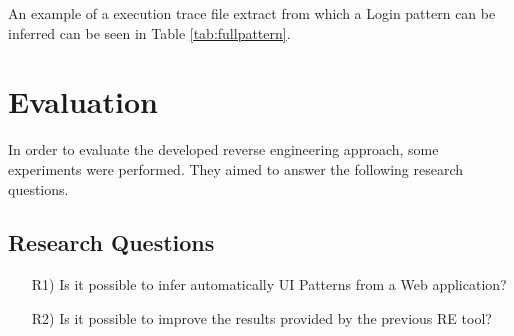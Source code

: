 \documentclass[conference]{IEEEtran}
\begin{document}
An example of a execution trace file extract from which a Login pattern can be inferred can be seen in Table \ref{tab:fullpattern}.

\begin{table}[!htb]
\caption{Execution trace example from which a Login pattern can be inferred.}
\label{tab:fullpattern}
\end{table}

\section{Evaluation}\label{sec:eval}

In order to evaluate the developed reverse engineering approach, some experiments were performed. They aimed to answer the following research questions.

\subsection{Research Questions}
\begin{itemize}
  \item[R1)] Is it possible to infer automatically UI Patterns from a Web application?\\
  \item[R2)] Is it possible to improve the results provided by the previous RE tool?\\
\end{itemize}
\end{document}
